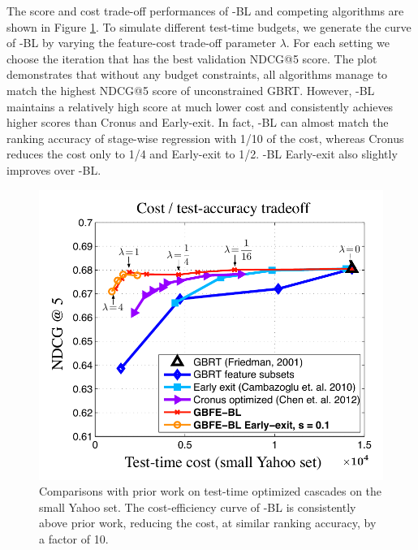 The score and cost trade-off performances of \name{}-BL and competing algorithms are shown in Figure \ref{fig:precision}. To simulate different test-time budgets, we generate the curve of \name{}-BL by varying the feature-cost trade-off parameter $\lambda$. For each setting we choose the iteration that has the best validation NDCG@5 score. The plot demonstrates that without any budget constraints, all algorithms manage to match the highest NDCG@5 score of unconstrained GBRT. However, \name{}-BL maintains a relatively high score at much lower cost and consistently achieves higher scores than Cronus and Early-exit. In fact, \name{}-BL can almost match the ranking accuracy of stage-wise regression with 1/10 of the cost, whereas Cronus reduces the cost only to 1/4 and Early-exit to 1/2. \name{}-BL Early-exit also slightly improves over \name{}-BL.

\begin{figure}[t]
\centerline{
\includegraphics[width = .67\textwidth]{plots/precision_compare}
}
\vspace{-1.5ex}
\caption{Comparisons with prior work on test-time optimized cascades on the small Yahoo set. The cost-efficiency curve of \name{}-BL is consistently above prior work, reducing the cost, at similar ranking accuracy, by a factor of 10.   \label{fig:precision} }
\end{figure}

